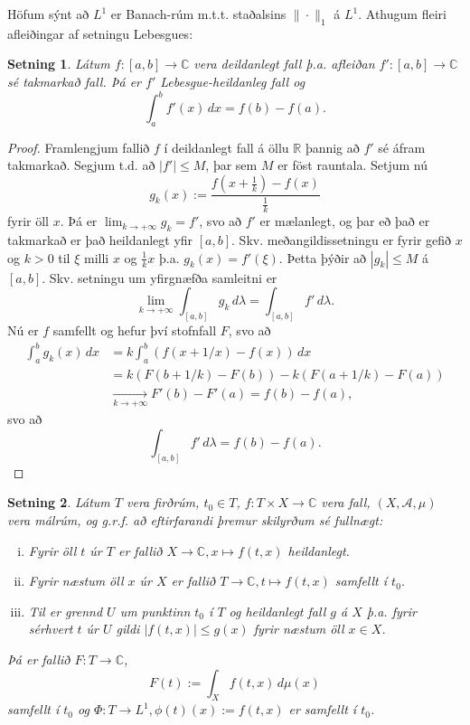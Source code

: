 \documentclass[a4paper,icelandic,11pt]{book}
\theoremstyle{plain}      \newtheorem{setn}{Setning}[chapter]
\theoremstyle{definition} \newtheorem{skilgr}[setn]{Skilgreining}
\theoremstyle{remark}     \newtheorem*{ath}{Athugasemd}
\newcommand{\R}{\mathbb R}
\newcommand{\C}{\mathbb C}
\begin{document}
Höfum sýnt að $L^{1}$ er Banach-rúm m.t.t. staðalsins $\|\cdot\|_{1}$
á $L^{1}$. Athugum fleiri afleiðingar af setningu Lebesgues:
\begin{setn}
  Látum $f:[a,b]\to\C$ vera deildanlegt fall þ.a. afleiðan
  $f':[a,b]\to\C$ sé takmarkað fall. Þá er $f'$ Lebesgue-heildanleg
  fall og
  \[
  \int_{a}^{b}f'(x)\,dx = f(b) - f(a).
  \]
\end{setn}
\begin{proof}
  Framlengjum fallið $f$ í deildanlegt fall á öllu $\R$ þannig að $f'$
  sé áfram takmarkað. Segjum t.d. að $|f'|\le M$, þar sem $M$ er föst
  rauntala. Setjum nú
  \[
  g_{k}(x) := \frac{f(x+\frac 1k) - f(x)}{\frac 1k}
  \]
  fyrir öll $x$. Þá er $\lim_{k\to+\infty}g_{k}=f'$, svo að $f'$ er
  mælanlegt, og þar eð það er takmarkað er það heildanlegt yfir
  $[a,b]$. Skv. meðangildissetningu er fyrir gefið $x$ og $k>0$ til
  $\xi$ milli $x$ og $\frac 1k x$ þ.a. $g_{k}(x)=f'(\xi)$. Þetta þýðir
  að $|g_{k}|\le M$ á $[a,b]$. Skv. setningu um yfirgnæfða samleitni
  er
  \[
  \lim_{k\to+\infty}\int_{[a,b]}g_{k}\,d\lambda
  = \int_{[a,b]}f'\,d\lambda.
  \]
  Nú er $f$ samfellt og hefur því stofnfall $F$, svo að
  \begin{align*}
    \int_{a}^{b}g_{k}(x)\,dx
    &= k \int_{a}^{b}\left(
      f(x+1/x) - f(x)
    \right)\,dx
    \\
    &= k(F(b+1/k) - F(b)) - k(F(a+1/k) - F(a))
    \\
    &\xrightarrow[k\to+\infty]{} F'(b)-F'(a)
    = f(b) - f(a),
  \end{align*}
  svo að
  \[
  \int_{[a,b]}f'\,d\lambda 
  = f(b) - f(a).
  \]
\end{proof}
\begin{setn}
  Látum $T$ vera firðrúm, $t_{0}\in T$, $f:T\times X\to\C$ vera fall,
  $(X,\mathcal A,\mu)$ vera málrúm, og g.r.f. að eftirfarandi þremur
  skilyrðum sé fullnægt:
  \begin{enumerate}[(i)]
  \item Fyrir öll $t$ úr $T$ er fallið $X\to\C, x\mapsto f(t,x)$
    heildanlegt.
  \item Fyrir næstum öll $x$ úr $X$ er fallið $T\to\C,t\mapsto f(t,x)$
    samfellt í $t_{0}$.
  \item Til er grennd $U$ um punktinn $t_{0}$ í $T$ og heildanlegt
    fall $g$ á $X$ þ.a. fyrir sérhvert $t$ úr $U$ gildi
    $|f(t,x)|\le{g(x)}$ fyrir næstum öll $x\in X$.
  \end{enumerate}
  Þá er fallið $F:T\to\C$,
  \[
  F(t) := \int_{X}f(t,x)\,d\mu(x)
  \]
  samfellt í $t_{0}$ og $\Phi:T\to L^{1},\phi(t)(x) := f(t,x)$ er
  samfellt í $t_{0}$.
\end{setn}
\end{document}

